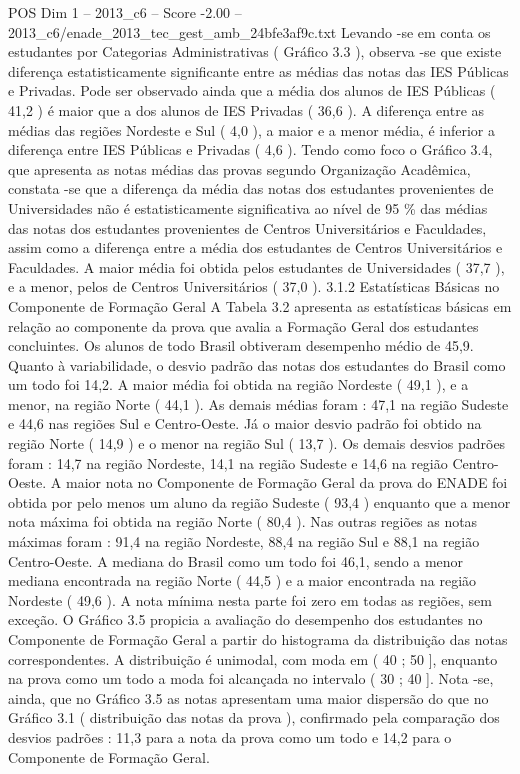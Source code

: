 \begin{textsample}{POS Dim 1 – 2013\_c6 – Score -2.00 – 2013\_c6/enade\_2013\_tec\_gest\_amb\_24bfe3af9c.txt}
Levando -se em conta os estudantes por Categorias Administrativas ( Gráfico 3.3 ), observa -se que existe diferença estatisticamente significante entre as médias das notas das IES Públicas e Privadas.
Pode ser observado ainda que a média dos alunos de IES Públicas ( 41,2 ) é maior que a dos alunos de IES Privadas ( 36,6 ).
A diferença entre as médias das regiões Nordeste e Sul ( 4,0 ), a maior e a menor média, é inferior a diferença entre IES Públicas e Privadas ( 4,6 ).
Tendo como foco o Gráfico 3.4, que apresenta as notas médias das provas segundo Organização Acadêmica, constata -se que a diferença da média das notas dos estudantes provenientes de Universidades não é estatisticamente significativa ao nível de 95 \% das médias das notas dos estudantes provenientes de Centros Universitários e Faculdades, assim como a diferença entre a média dos estudantes de Centros Universitários e Faculdades.
A maior média foi obtida pelos estudantes de Universidades ( 37,7 ), e a menor, pelos de Centros Universitários ( 37,0 ). 3.1.2 Estatísticas Básicas no Componente de Formação Geral A Tabela 3.2 apresenta as estatísticas básicas em relação ao componente da prova que avalia a Formação Geral dos estudantes concluintes.
Os alunos de todo Brasil obtiveram desempenho médio de 45,9.
Quanto à variabilidade, o desvio padrão das notas dos estudantes do Brasil como um todo foi 14,2.
A maior média foi obtida na região Nordeste ( 49,1 ), e a menor, na região Norte ( 44,1 ).
As demais médias foram : 47,1 na região Sudeste e 44,6 nas regiões Sul e Centro-Oeste.
Já o maior desvio padrão foi obtido na região Norte ( 14,9 ) e o menor na região Sul ( 13,7 ).
Os demais desvios padrões foram : 14,7 na região Nordeste, 14,1 na região Sudeste e 14,6 na região Centro-Oeste.
A maior nota no Componente de Formação Geral da prova do ENADE foi obtida por pelo menos um aluno da região Sudeste ( 93,4 ) enquanto que a menor nota máxima foi obtida na região Norte ( 80,4 ).
Nas outras regiões as notas máximas foram : 91,4 na região Nordeste, 88,4 na região Sul e 88,1 na região Centro-Oeste.
A mediana do Brasil como um todo foi 46,1, sendo a menor mediana encontrada na região Norte ( 44,5 ) e a maior encontrada na região Nordeste ( 49,6 ).
A nota mínima nesta parte foi zero em todas as regiões, sem exceção.
O Gráfico 3.5 propicia a avaliação do desempenho dos estudantes no Componente de Formação Geral a partir do histograma da distribuição das notas correspondentes.
A distribuição é unimodal, com moda em ( 40 ; 50 ], enquanto na prova como um todo a moda foi alcançada no intervalo ( 30 ; 40 ].
Nota -se, ainda, que no Gráfico 3.5 as notas apresentam uma maior dispersão do que no Gráfico 3.1 ( distribuição das notas da prova ), confirmado pela comparação dos desvios padrões : 11,3 para a nota da prova como um todo e 14,2 para o Componente de Formação Geral.

\end{textsample}
